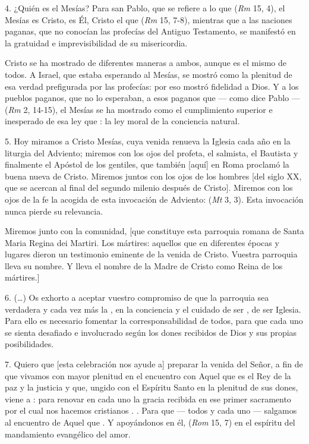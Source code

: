 \begin{body}
\begin{body}
	4. ¿Quién es el Mesías? Para san Pablo, que se refiere a lo que  (\emph{Rm} 15, 4), el Mesías es Cristo, es Él, Cristo el que  (\emph{Rm} 15, 7-8), mientras que a las naciones paganas, que no conocían las profecías del Antiguo Testamento, se manifestó en la gratuidad e imprevisibilidad de su misericordia.
	
	Cristo se ha mostrado de diferentes maneras a ambos, aunque es el mismo  de todos. A Israel, que estaba esperando al Mesías, se mostró como la plenitud de esa verdad prefigurada por las profecías: por eso mostró fidelidad a Dios. Y a los pueblos paganos, que no lo esperaban, a esos paganos que --- como dice Pablo ---  (\emph{Rm} 2, 14-15), el Mesías se ha mostrado como el cumplimiento superior e inesperado de esa ley que : la ley moral de la conciencia natural.
	
	5. Hoy miramos a Cristo Mesías, cuya venida renueva la Iglesia cada año en la liturgia del Adviento; miremos con los ojos del profeta, el salmista, el Bautista y finalmente el Apóstol de los gentiles, que también {[}aquí{]} en Roma proclamó la buena nueva de Cristo. Miremos juntos con los ojos de los hombres {[}del siglo XX, que se acercan al final del segundo milenio después de Cristo{]}. Miremos con los ojos de la fe la acogida de esta invocación de Adviento:  (\emph{Mt} 3, 3). Esta invocación nunca pierde su relevancia.
	
	Miremos junto con la comunidad, {[}que constituye esta parroquia romana de Santa Maria Regina dei Martiri. Los mártires: aquellos que en diferentes épocas y lugares dieron un testimonio eminente de la venida de Cristo. Vuestra parroquia lleva su nombre. Y lleva el nombre de la Madre de Cristo como Reina de los mártires.{]}
	
	6. (\ldots{}) Os exhorto a aceptar vuestro compromiso de que la parroquia sea verdadera y cada vez más la , en la conciencia y el cuidado de ser , de ser Iglesia. Para ello es necesario fomentar la corresponsabilidad de todos, para que cada uno se sienta desafiado e involucrado según los dones recibidos de Dios y sus propias posibilidades.
	
	7.  Quiero que {[}esta celebración nos ayude a{]} preparar la venida del Señor, a fin de que vivamos con mayor plenitud en el encuentro con Aquel que es el Rey de la paz y la justicia y que, ungido con el Espíritu Santo en la plenitud de sus dones, viene a : para renovar en cada uno la gracia recibida en ese primer sacramento por el cual nos hacemos cristianos . . Para que --- todos y cada uno --- salgamos al encuentro de Aquel que . Y apoyándonos en él,  (\emph{Rom} 15, 7) en el espíritu del mandamiento evangélico del amor.
	

\end{body}
\end{body}
